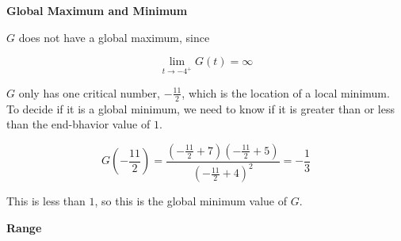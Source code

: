 \documentclass{ximera}
\begin{document}
\textbf{\textcolor{purple!85!blue}{Global Maximum and Minimum}} 

\begin{explanation}


$G$ does not have a global maximum, since 


\[
\lim\limits_{t \to -4^+} G(t) = \infty
\]


$G$ only has one critical number, $-\frac{11}{2}$, which is the location of a local minimum.  To decide if it is a global minimum, we need to know if it is greater than or less than the end-bhavior value of $1$.




\[
G\left( -\frac{11}{2} \right) = \frac{\left( -\frac{11}{2}+7 \right) \left( -\frac{11}{2}+5 \right)}{\left( -\frac{11}{2}+4 \right)^2} = -\frac{1}{3} 
\]


This is less than $1$, so this is the global minimum value of $G$. 



\end{explanation}














\textbf{\textcolor{purple!85!blue}{Range}} 
\end{document}
